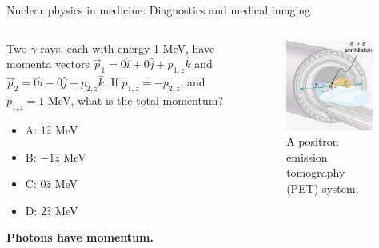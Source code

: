 \documentclass{beamer}
\begin{document}
\begin{frame}{Nuclear physics in medicine: Diagnostics and medical imaging}
\begin{columns}[T]
\begin{column}{0.5\textwidth}
\small
Two $\gamma$ rays, each with energy 1 MeV, have momenta vectors $\vec{p}_1 = 0 \hat{i} + 0 \hat{j} + p_{1,z}\hat{k}$ and $\vec{p}_2 = 0 \hat{i} + 0 \hat{j} + p_{2,z}\hat{k}$.  If $p_{1,z} = -p_{2,z}$, and $p_{1,z} = 1$ MeV, what is the total momentum?
\begin{itemize}
\item A: $1\hat{z}$ MeV
\item B: $-1\hat{z}$ MeV
\item C: $0\hat{z}$ MeV
\item D: $2\hat{z}$ MeV
\end{itemize}
\textbf{Photons have momentum.}
\end{column}
\begin{column}{0.5\textwidth}
\begin{figure}
\centering
\includegraphics[width=0.95\textwidth]{figures/PET.png}
\caption{\label{fig:medicine_4} A positron emission tomography (PET) system.}
\end{figure}
\end{column}
\end{columns}
\end{frame}
\end{document}
